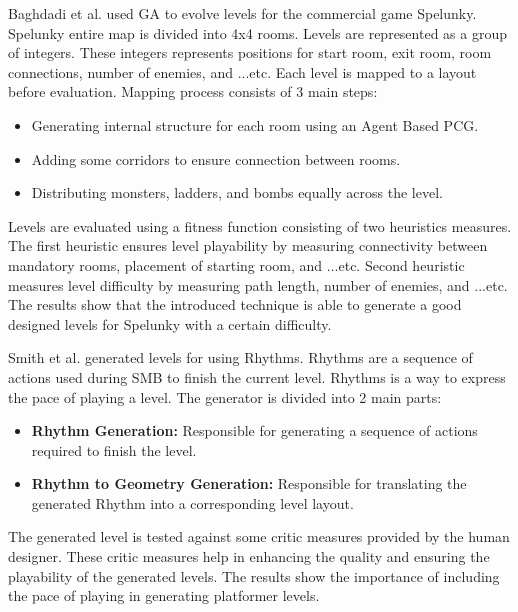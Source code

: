 Baghdadi et al.\cite{spelunkyLevelGeneration} used GA to evolve levels for the commercial game Spelunky\cite{spelunky}. Spelunky entire map is divided into 4x4 rooms. Levels are represented as a group of integers. These integers represents positions for start room, exit room, room connections, number of enemies, and ...etc. Each level is mapped to a layout before evaluation. Mapping process consists of 3 main steps:
\begin{itemize} \itemsep0pt \parskip0pt 
	\item Generating internal structure for each room using an Agent Based PCG.
	\item Adding some corridors to ensure connection between rooms.
	\item Distributing monsters, ladders, and bombs equally across the level.
\end{itemize}
Levels are evaluated using a fitness function consisting of two heuristics measures. The first heuristic ensures level playability by measuring connectivity between mandatory rooms, placement of starting room, and ...etc. Second heuristic measures level difficulty by measuring path length, number of enemies, and ...etc. The results show that the introduced technique is able to generate a good designed levels for Spelunky with a certain difficulty.\\\par

Smith et al.\cite{rythmBasedGeneration} generated levels for  using Rhythms. Rhythms are a sequence of actions used during SMB to finish the current level. Rhythms is a way to express the pace of playing a level. The generator is divided into 2 main parts: 
\begin{itemize} \itemsep0pt \parskip0pt 
	\item \textbf{Rhythm Generation:} Responsible for generating a sequence of actions required to finish the level.
	\item \textbf{Rhythm to Geometry Generation:} Responsible for translating the generated Rhythm into a corresponding level layout.
\end{itemize}
The generated level is tested against some critic measures provided by the human designer. These critic measures help in enhancing the quality and ensuring the playability of the generated levels. The results show the importance of including the pace of playing in generating platformer levels.\\\par


